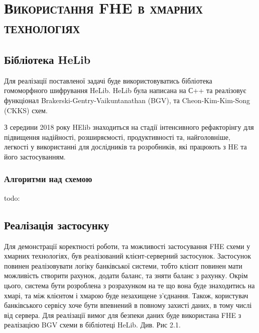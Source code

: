 \newpage

\chapter{\textsc{Використання FHE в хмарних технологіях}}

\section{Бібліотека HeLib}
Для реалізації поставленої задачі буде використовуватись бібліотека гомоморфного шифрування
HeLib. HeLib була написана на С++ та реалізовує функціонал  Brakerski-Gentry-Vaikuntanathan 
(BGV), та Cheon-Kim-Kim-Song (CKKS) схем.

З середини 2018 року HElib знаходиться на стадії інтенсивного рефакторінгу для підвищення
надійності, розширяємості, продуктивності та, найголовніше, легкості у використанні для дослідників та розробників, які працюють з HE та його застосуванням.

\subsection{Алгоритми над схемою}
todo:


\section{Реалізація застосунку}
Для демонстрації коректності роботи, та можливості застосування FHE схеми у хмарних 
технологіях, був реалізований клієнт-серверний застосунок. Застосунок повинен реалізовувати
логіку банківської системи, тобто клієнт повинен мати можливість створити рахунок,
додати баланс, та зняти баланс з рахунку. Окрім цього, система бути розроблена з розрахунком
на те що вона буде знаходитись на хмарі, та між клієнтом і хмарою буде незахищене з'єднання.
Також, користувач банківського сервісу хоче бути впевнений в повному захисті даних, в тому
числі від сервера. Для реалізації вимог для безпеки даних буде використана FHE з реалізацією
BGV схеми в бібліотеці HeLib. Див. Рис 2.1.


